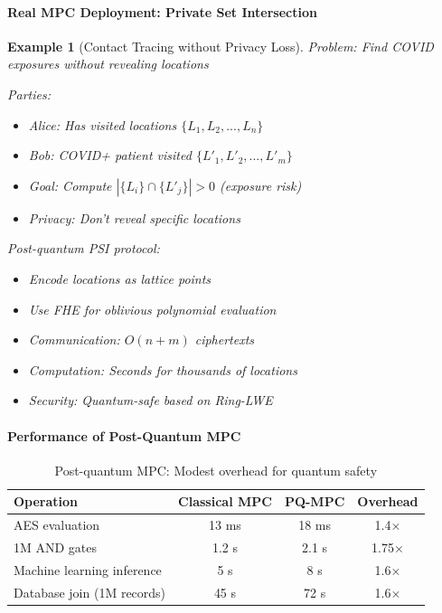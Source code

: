 \documentclass[11pt,a4paper]{article}
\newtheorem{example}{Example}
\begin{document}
\paragraph{Real MPC Deployment: Private Set Intersection}

\begin{example}[Contact Tracing without Privacy Loss]
Problem: Find COVID exposures without revealing locations

Parties:
\begin{itemize}
    \item Alice: Has visited locations $\{L_1, L_2, ..., L_n\}$
    \item Bob: COVID+ patient visited $\{L'_1, L'_2, ..., L'_m\}$
    \item Goal: Compute $|\{L_i\} \cap \{L'_j\}| > 0$ (exposure risk)
    \item Privacy: Don't reveal specific locations
\end{itemize}

Post-quantum PSI protocol:
\begin{itemize}
    \item Encode locations as lattice points
    \item Use FHE for oblivious polynomial evaluation
    \item Communication: $O(n + m)$ ciphertexts
    \item Computation: Seconds for thousands of locations
    \item Security: Quantum-safe based on Ring-LWE
\end{itemize}
\end{example}

\paragraph{Performance of Post-Quantum MPC}

\begin{table}[h]
\centering
\begin{tabular}{|l|c|c|c|}
\hline
\textbf{Operation} & \textbf{Classical MPC} & \textbf{PQ-MPC} & \textbf{Overhead} \\
\hline
AES evaluation & 13 ms & 18 ms & 1.4× \\
1M AND gates & 1.2 s & 2.1 s & 1.75× \\
Machine learning inference & 5 s & 8 s & 1.6× \\
Database join (1M records) & 45 s & 72 s & 1.6× \\
\hline
\end{tabular}
\caption{Post-quantum MPC: Modest overhead for quantum safety}
\end{table}
\end{document}
